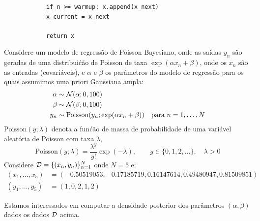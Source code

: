 \begin{exenumerate}
\begin{solution}
\begin{lstlisting}
            if n >= warmup: x.append(x_next)
            x_current = x_next
            
            return x
        \end{lstlisting}
    \end{solution}
    
\end{exenumerate}


\label{q:poisson-reg-alt}
Considere um modelo de regress\~ao de Poisson
Bayesiano, onde as sa\'idas $y_n$ s\~ao geradas de uma distribui\'c\~ao de Poisson
de taxa $\exp(\alpha x_n + \beta)$, onde os $x_n$ s\~ao as entradas (covari\'aveis), e $\alpha$ e $\beta$ os par\^ametros do modelo de regress\~ao para os quais assumimos uma priori Gaussiana ampla:
\begin{align}
    \alpha &\sim \mathcal{N}(\alpha; 0, 100) \\
    \beta &\sim \mathcal{N}(\beta; 0, 100)\\
    y_n &\sim \mathrm{Poisson}(y_n; \exp(\alpha x_n + \beta)) \quad \text{para } n = 1, \dots, N 
\end{align}
$\mathrm{Poisson}(y ;\lambda)$ denota a fun\'c\~ao de massa de probabilidade
de uma vari\'avel aleat\'oria de Poisson com taxa $\lambda$,
\begin{equation}
    \mathrm{Poisson}(y; \lambda) = \frac{\lambda^y}{y!}\exp(-\lambda), \quad \quad y \in \{0, 1, 2, \ldots\}, \quad \lambda > 0
\end{equation}
Considere $\mathcal{D} = \{(x_n, y_n)\}_{n=1}^N$ onde $N=5$ e:
\begin{align}
    (x_1, \ldots, x_5) &= (-0.50519053, -0.17185719,  0.16147614,  0.49480947,  0.81509851)\\
    (y_1, \ldots, y_5) &= (1, 0, 2, 1, 2)
\end{align}

Estamos interessados em computar a densidade posterior dos par\^ametros
$(\alpha, \beta)$ dados os dados $\mathcal{D}$ acima.

